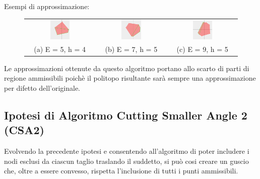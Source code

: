 \begin{center}
    Esempi di approssimazione:
\end{center}
\begin{figure}[H]
    \centering
    \begin{tabular}{ccc}
        \includegraphics[width=0.3\textwidth]{media/CuttingSmallerAngle/5_4.png} &
        \includegraphics[width=0.3\textwidth]{media/CuttingSmallerAngle/7_5.png} &
        \includegraphics[width=0.3\textwidth]{media/CuttingSmallerAngle/9_5.png} \\
        (a) E = 5, h = 4 & (b) E = 7, h = 5 & (c) E = 9, h = 5
    \end{tabular}
\end{figure}

Le approssimazioni ottenute da questo algoritmo portano allo scarto di parti di regione ammissibili
poichè il politopo risultante sarà sempre una approssimazione per difetto dell'originale.

\pagebreak
\subsection{Ipotesi di Algoritmo Cutting Smaller Angle 2 (CSA2)}

Evolvendo la precedente ipotesi e consentendo all'algoritmo di poter includere i nodi esclusi 
da ciascun taglio traslando il suddetto, si può cosi creare un guscio che, oltre a essere 
convesso, rispetta l'inclusione di tutti i punti ammissibili.


